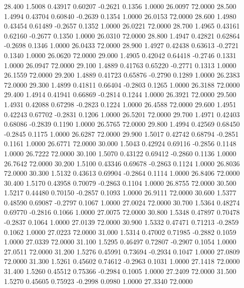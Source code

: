   28.400   1.5008   0.43917   0.60207  -0.2621   0.1356   1.0000  26.0097  72.0000
  28.500   1.4994   0.43704   0.60840  -0.2639   0.1354   1.0000  26.0153  72.0000
  28.600   1.4980   0.43454   0.61489  -0.2657   0.1352   1.0000  26.0221  72.0000
  28.700   1.4965   0.43161   0.62160  -0.2677   0.1350   1.0000  26.0310  72.0000
  28.800   1.4947   0.42821   0.62864  -0.2698   0.1346   1.0000  26.0433  72.0000
  28.900   1.4927   0.42438   0.63613  -0.2721   0.1340   1.0000  26.0620  72.0000
  29.000   1.4905   0.42042   0.64418  -0.2746   0.1331   1.0000  26.0947  72.0000
  29.100   1.4889   0.41763   0.65220  -0.2771   0.1313   1.0000  26.1559  72.0000
  29.200   1.4889   0.41723   0.65876  -0.2790   0.1289   1.0000  26.2383  72.0000
  29.300   1.4899   0.41811   0.66404  -0.2803   0.1265   1.0000  26.3188  72.0000
  29.400   1.4914   0.41941   0.66869  -0.2814   0.1244   1.0000  26.3921  72.0000
  29.500   1.4931   0.42088   0.67298  -0.2823   0.1224   1.0000  26.4588  72.0000
  29.600   1.4951   0.42243   0.67702  -0.2831   0.1206   1.0000  26.5201  72.0000
  29.700   1.4971   0.42403   0.68086  -0.2839   0.1190   1.0000  26.5765  72.0000
  29.800   1.4994   0.42569   0.68450  -0.2845   0.1175   1.0000  26.6287  72.0000
  29.900   1.5017   0.42742   0.68794  -0.2851   0.1161   1.0000  26.6771  72.0000
  30.000   1.5043   0.42924   0.69116  -0.2856   0.1148   1.0000  26.7222  72.0000
  30.100   1.5070   0.43122   0.69412  -0.2860   0.1136   1.0000  26.7642  72.0000
  30.200   1.5100   0.43346   0.69678  -0.2863   0.1124   1.0000  26.8036  72.0000
  30.300   1.5132   0.43613   0.69904  -0.2864   0.1114   1.0000  26.8406  72.0000
  30.400   1.5170   0.43958   0.70079  -0.2863   0.1104   1.0000  26.8755  72.0000
  30.500   1.5217   0.44480   0.70150  -0.2857   0.1093   1.0000  26.9111  72.0000
  30.600   1.5377   0.48590   0.69087  -0.2797   0.1067   1.0000  27.0024  72.0000
  30.700   1.5364   0.48274   0.69770  -0.2816   0.1066   1.0000  27.0075  72.0000
  30.800   1.5348   0.47897   0.70478  -0.2837   0.1064   1.0000  27.0139  72.0000
  30.900   1.5332   0.47471   0.71213  -0.2859   0.1062   1.0000  27.0223  72.0000
  31.000   1.5314   0.47002   0.71985  -0.2882   0.1059   1.0000  27.0339  72.0000
  31.100   1.5295   0.46497   0.72807  -0.2907   0.1054   1.0000  27.0511  72.0000
  31.200   1.5276   0.45991   0.73694  -0.2934   0.1047   1.0000  27.0809  72.0000
  31.300   1.5261   0.45602   0.74612  -0.2963   0.1031   1.0000  27.1418  72.0000
  31.400   1.5260   0.45512   0.75366  -0.2984   0.1005   1.0000  27.2409  72.0000
  31.500   1.5270   0.45605   0.75923  -0.2998   0.0980   1.0000  27.3340  72.0000
